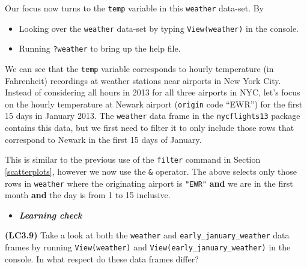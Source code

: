 \documentclass[12pt,]{krantz}
\makeatletter
\newenvironment{Shaded}{\begin{snugshade}}{\end{snugshade}}
\newcommand{\KeywordTok}[1]{\textcolor[rgb]{0.27,0.27,0.27}{\textbf{#1}}}
\newcommand{\DecValTok}[1]{\textcolor[rgb]{0.06,0.06,0.06}{#1}}
\newcommand{\StringTok}[1]{\textcolor[rgb]{0.5,0.5,0.5}{#1}}
\newcommand{\OperatorTok}[1]{\textcolor[rgb]{0.43,0.43,0.43}{\textbf{#1}}}
\newcommand{\NormalTok}[1]{#1}
\providecommand{\tightlist}{%
  \setlength{\itemsep}{0pt}\setlength{\parskip}{0pt}}
\newenvironment{kframe}{%
\medskip{}
\setlength{\fboxsep}{.8em}
 \def\at@end@of@kframe{}%
 \ifinner\ifhmode%
  \def\at@end@of@kframe{\end{minipage}}%
  \begin{minipage}{\columnwidth}%
 \fi\fi%
 \def\FrameCommand##1{\hskip\@totalleftmargin \hskip-\fboxsep
 \colorbox{shadecolor}{##1}\hskip-\fboxsep
     \hskip-\linewidth \hskip-\@totalleftmargin \hskip\columnwidth}%
 \MakeFramed {\advance\hsize-\width
   \@totalleftmargin\z@ \linewidth\hsize
   \@setminipage}}%
 {\par\unskip\endMakeFramed%
 \at@end@of@kframe}
\renewenvironment{Shaded}{\begin{kframe}}{\end{kframe}}
\newenvironment{rmdblock}[1]
  {\begin{shaded*}
  \begin{itemize}
  \renewcommand{\labelitemi}{
    \raisebox{-.7\height}[0pt][0pt]{
    }
  }
  \item
  }
  {
  \end{itemize}
  \end{shaded*}
  }
\newenvironment{learncheck}
  {\begin{rmdblock}{warning}}
  {\end{rmdblock}}
\makeatother
\begin{document}
Our focus now turns to the \texttt{temp} variable in this
\texttt{weather} data-set. By

\begin{itemize}
\tightlist
\item
  Looking over the \texttt{weather} data-set by typing
  \texttt{View(weather)} in the console.
\item
  Running \texttt{?weather} to bring up the help file.
\end{itemize}

We can see that the \texttt{temp} variable corresponds to hourly
temperature (in Fahrenheit) recordings at weather stations near airports
in New York City. Instead of considering all hours in 2013 for all three
airports in NYC, let's focus on the hourly temperature at Newark airport
(\texttt{origin} code ``EWR'') for the first 15 days in January 2013.
The \texttt{weather} data frame in the \texttt{nycflights13} package
contains this data, but we first need to filter it to only include those
rows that correspond to Newark in the first 15 days of January.

\begin{Shaded}
\end{Shaded}

This is similar to the previous use of the \texttt{filter} command in
Section \ref{scatterplots}, however we now use the \texttt{\&} operator.
The above selects only those rows in \texttt{weather} where the
originating airport is \texttt{"EWR"} \textbf{and} we are in the first
month \textbf{and} the day is from 1 to 15 inclusive.

\begin{learncheck}
\textbf{\emph{Learning check}}
\end{learncheck}

\textbf{(LC3.9)} Take a look at both the \texttt{weather} and
\texttt{early\_january\_weather} data frames by running
\texttt{View(weather)} and \texttt{View(early\_january\_weather)} in the
console. In what respect do these data frames differ?
\end{document}
